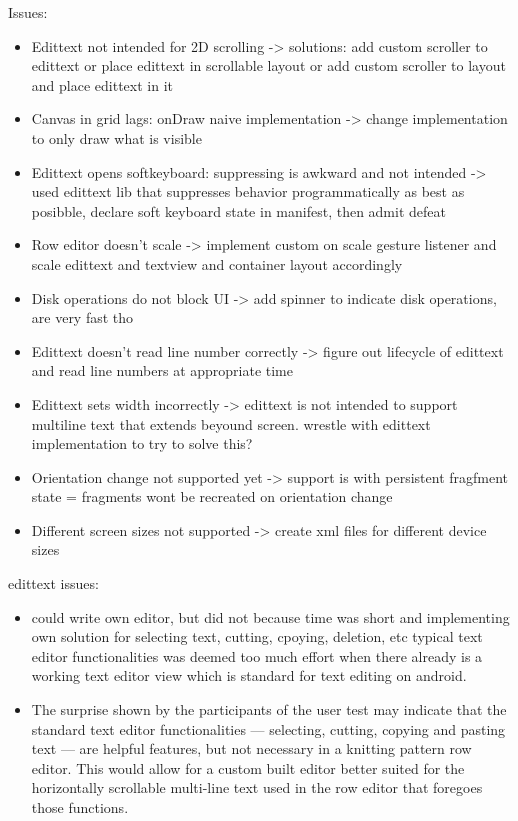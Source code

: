 Issues:
\begin{itemize}
\item Edittext not intended for 2D scrolling
-> solutions: 
	add custom scroller to edittext or place edittext in scrollable layout or add custom scroller to layout and place edittext in it
\item Canvas in grid lags: onDraw naive implementation
-> change implementation to only draw what is visible
\item Edittext opens softkeyboard: suppressing is awkward and not intended
-> used edittext lib that suppresses behavior programmatically as best as posibble, declare soft keyboard state in manifest, then admit defeat
\item Row editor doesn’t scale
-> implement custom on scale gesture listener and scale edittext and textview and container layout accordingly
\item Disk operations do not block UI
-> add spinner to indicate disk operations, are very fast tho
\item Edittext doesn’t read line number correctly
-> figure out lifecycle of edittext and read line numbers at appropriate time
\item Edittext sets width incorrectly
-> edittext is not intended to support multiline text that extends beyound screen. wrestle with edittext implementation to try to solve this?
\item Orientation change not supported yet
-> support is with persistent fragfment state = fragments wont be recreated on orientation change
\item Different screen sizes not supported
-> create xml files for different device sizes
\end{itemize}

edittext issues:
\begin{itemize}
\item could write own editor, but did not because time was short and implementing own solution for selecting text, cutting, cpoying, deletion, etc typical text editor functionalities was deemed too much effort when there already is a working text editor view which is standard for text editing on android.
\item The surprise shown by the participants of the user test may indicate that the standard text editor functionalities --- selecting, cutting, copying and pasting text --- are helpful features, but not necessary in a knitting pattern row editor. This would allow for a custom built editor better suited for the horizontally scrollable multi-line text used in the row editor that foregoes those functions. 
\end{itemize}